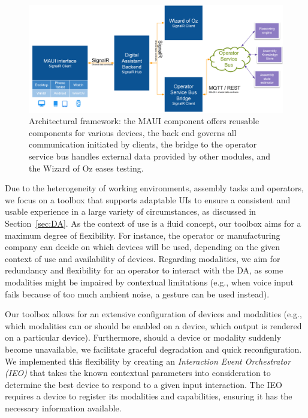 \begin{figure}
    \centering
    \includegraphics[width=1\linewidth]{figs/UI-architecture.png}
    \caption{Architectural framework: the MAUI component offers reusable components for various devices, the back end governs all communication initiated by clients, the bridge to the operator service bus handles external data provided by other modules, and the Wizard of Oz eases testing.}
    \label{fig:ui-architecture}
\end{figure}

Due to the heterogeneity of working environments, assembly tasks and operators, we focus on a toolbox that supports adaptable UIs to ensure a consistent and usable experience in a large variety of circumstances, as discussed in Section~\ref{sec:DA}. As the context of use is a fluid concept, our toolbox aims for a maximum degree of flexibility. For instance, the operator or manufacturing company can decide on which devices will be used, depending on the given context of use and availability of devices. Regarding modalities, we aim for redundancy and flexibility for an operator to interact with the DA, as some modalities might be impaired by contextual limitations (e.g., when voice input fails because of too much ambient noise, a gesture can be used instead).

Our toolbox allows for an extensive configuration of devices and modalities (e.g., which modalities can or should be enabled on a device, which output is rendered on a particular device). Furthermore, should a device or modality suddenly become unavailable, we facilitate graceful degradation and quick reconfiguration. We implemented this flexibility by creating an \emph{Interaction Event Orchestrator (IEO)} that takes the known contextual parameters into consideration to determine the best device to respond to a given input interaction. The IEO requires a device to register its modalities and capabilities, ensuring it has the necessary information available.


